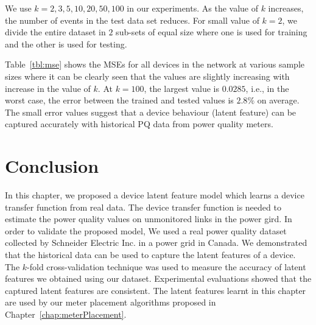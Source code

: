 We use $k=2,3,5,10,20,50,100$ in our experiments. As the value of $k$ increases, the number of events in the test data set reduces. For small value of $k=2$, we divide the entire dataset in $2$ sub-sets of equal size where one is used for training and the other is used for testing.

Table~\ref{tbl:mse} shows the MSEs for all devices in the network at various sample sizes where it can be clearly seen that the values are slightly increasing with increase in the value of $k$. At $k=100$, the largest value is $0.0285$, i.e., in the worst case, the error between the trained and tested values is $2.8\%$ on average. The small error values suggest that a device behaviour (latent feature) can be captured accurately with historical PQ data from power quality meters.

\section{Conclusion}
In this chapter, we proposed a device latent feature model which learns a device transfer function from real data. The device transfer function is needed to estimate the power quality values on unmonitored links in the power gird. In order to validate the proposed model, We used a real power quality dataset collected by Schneider Electric Inc. in a power grid in Canada. We demonstrated that the historical data can be used to capture the latent features of a device. The $k$-fold cross-validation technique was used to measure the accuracy of latent features we obtained using our dataset. Experimental evaluations showed that the captured latent features are consistent. The latent features learnt in this chapter are used by our meter placement algorithms proposed in Chapter~\ref{chap:meterPlacement}.